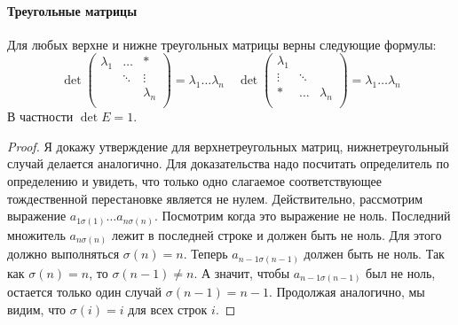 \paragraph{Треугольные матрицы}

\begin{claim}
\label{claim::DetUpperTr}
Для любых верхне и нижне треугольных матрицы верны следующие формулы:
\[
\det
\begin{pmatrix}
{\lambda_1}&{\ldots}&{*}\\
{}&{\ddots}&{\vdots}\\
{}&{}&{\lambda_n}\\
\end{pmatrix}
 = 
\lambda_1 \ldots \lambda_n
\quad
\det
\begin{pmatrix}
{\lambda_1}&{}&{}\\
{\vdots}&{\ddots}&{}\\
{*}&{\ldots}&{\lambda_n}\\
\end{pmatrix}
 = 
 \lambda_1 \ldots \lambda_n
\]
В частности $\det E = 1$.
\end{claim}
\begin{proof}
Я докажу утверждение для верхнетреугольных матриц, нижнетреугольный случай делается аналогично.
Для доказательства надо посчитать определитель по определению и увидеть, что только одно слагаемое соответствующее тождественной перестановке является не нулем.
Действительно, рассмотрим выражение $a_{1\sigma(1)}\ldots a_{n\sigma(n)}$.
Посмотрим когда это выражение не ноль.
Последний множитель $a_{n\sigma(n)}$ лежит в последней строке и должен быть не ноль.
Для этого должно выполняться $\sigma(n) = n$.
Теперь $a_{n-1\sigma(n-1)}$ должен быть не ноль.
Так как $\sigma(n) = n$, то $\sigma(n - 1)\neq n$.
А значит, чтобы $a_{n-1 \sigma(n-1)}$ был не ноль, остается только один случай $\sigma(n-1) = n-1$.
Продолжая аналогично, мы видим, что $\sigma(i) = i$ для всех строк $i$.
\end{proof}
